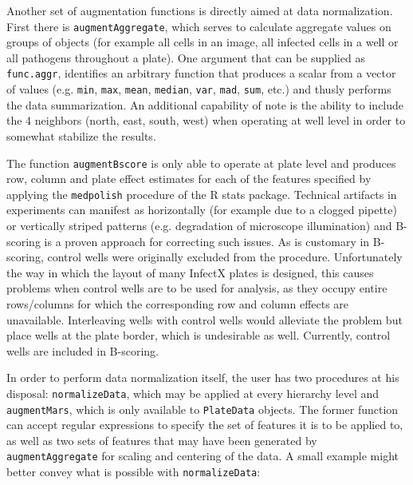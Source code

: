 Another set of augmentation functions is directly aimed at data normalization. First there is \texttt{augmentAggregate}, which serves to calculate aggregate values on groups of objects (for example all cells in an image, all infected cells in a well or all pathogens throughout a plate). One argument that can be supplied as \texttt{func.aggr}, identifies an arbitrary function that produces a scalar from a vector of values (e.g. \texttt{min}, \texttt{max}, \texttt{mean}, \texttt{median}, \texttt{var}, \texttt{mad}, \texttt{sum}, etc.) and thusly performs the data summarization. An additional capability of note is the ability to include the 4 neighbors (north, east, south, west) when operating at well level in order to somewhat stabilize the results.

The function \texttt{augmentBscore} is only able to operate at plate level and produces row, column and plate effect estimates for each of the features specified by applying the \texttt{medpolish} procedure of the R stats package. Technical artifacts in  experiments can manifest as horizontally (for example due to a clogged pipette) or vertically striped patterns (e.g. degradation of microscope illumination) and B-scoring is a proven approach for correcting such issues. As is customary in B-scoring, control wells were originally excluded from the procedure. Unfortunately the way in which the layout of many InfectX plates is designed, this causes problems when control wells are to be used for analysis, as they occupy entire rows\slash columns for which the corresponding row and column effects are unavailable. Interleaving  wells with control wells would alleviate the problem but place  wells at the plate border, which is undesirable as well. Currently, control wells are included in B-scoring.

In order to perform data normalization itself, the user has two procedures at his disposal: \texttt{normalizeData}, which may be applied at every hierarchy level and \texttt{augmentMars}, which is only available to \texttt{PlateData} objects. The former function can accept regular expressions to specify the set of features it is to be applied to, as well as two sets of features that may have been generated by \texttt{augmentAggregate} for scaling and centering of the data. A small example might better convey what is possible with \texttt{normalizeData}:


